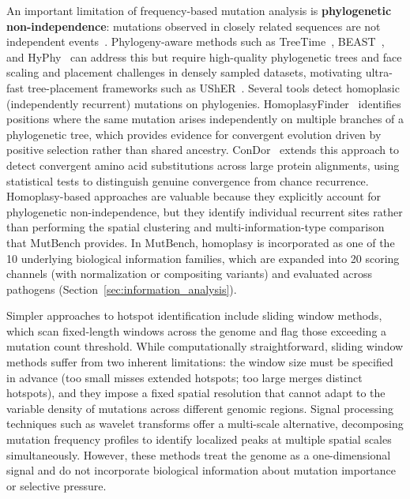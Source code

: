 An important limitation of frequency-based mutation analysis is \textbf{phylogenetic non-in\-de\-pen\-dence}: mutations observed in closely related sequences are not independent events~\cite{felsenstein1985phylogenies}.
Phylogeny-aware methods such as TreeTime~\cite{sagulenko2018treetime}, BEAST~\cite{suchard2018beast}, and HyPhy~\cite{kosakovsky2020hyphy} can address this but require high-quality phylogenetic trees and face scaling and placement challenges in densely sampled datasets, motivating ultra-fast tree-placement frameworks such as UShER~\cite{turakhia2020ultrafast}.
Several tools detect homoplasic (independently recurrent) mutations on phylogenies.
HomoplasyFinder~\cite{crispell2019homoplasyfinder} identifies positions where the same mutation arises independently on multiple branches of a phylogenetic tree, which provides evidence for convergent evolution driven by positive selection rather than shared ancestry.
ConDor~\cite{morel2024condor} extends this approach to detect convergent amino acid substitutions across large protein alignments, using statistical tests to distinguish genuine convergence from chance recurrence.
Homoplasy-based approaches are valuable because they explicitly account for phylogenetic non-independence, but they identify individual recurrent sites rather than performing the spatial clustering and multi-information-type comparison that MutBench provides.
In MutBench, homoplasy is incorporated as one of the 10 underlying biological information families, which are expanded into 20 scoring channels (with normalization or compositing variants) and evaluated across pathogens (Section~\ref{sec:information_analysis}).

Simpler approaches to hotspot identification include sliding window methods, which scan fixed-length windows across the genome and flag those exceeding a mutation count threshold.
While computationally straightforward, sliding window methods suffer from two inherent limitations: the window size must be specified in advance (too small misses extended hotspots; too large merges distinct hotspots), and they impose a fixed spatial resolution that cannot adapt to the variable density of mutations across different genomic regions.
Signal processing techniques such as wavelet transforms offer a multi-scale alternative, decomposing mutation frequency profiles to identify localized peaks at multiple spatial scales simultaneously.
However, these methods treat the genome as a one-dimensional signal and do not incorporate biological information about mutation importance or selective pressure.

